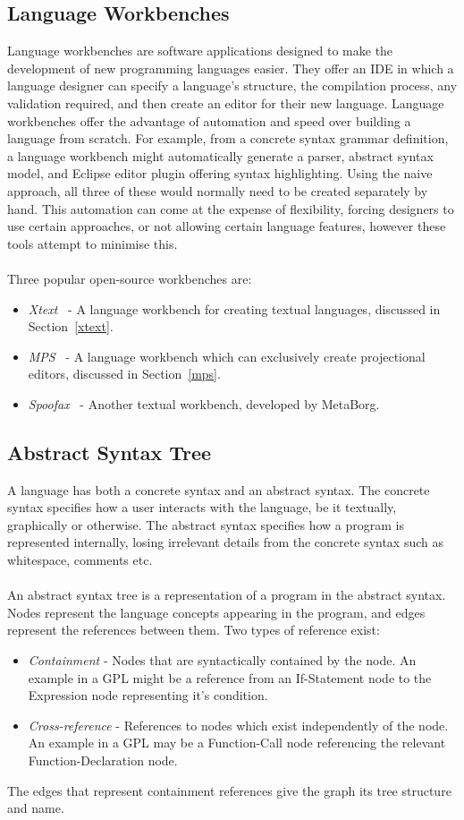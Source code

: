 \documentclass{article}
\begin{document}
\subsection{Language Workbenches}
Language workbenches are software applications designed to make the development of new programming languages easier. They offer an IDE in which a language designer can specify a language's structure, the compilation process, any validation required, and then create an editor for their new language. Language workbenches offer the advantage of automation and speed over building a language from scratch. For example, from a concrete syntax grammar definition, a language workbench might automatically generate a parser, abstract syntax model, and Eclipse editor plugin offering syntax highlighting. Using the naive approach, all three of these would normally need to be created separately by hand. This automation can come at the expense of flexibility, forcing designers to use certain approaches, or not allowing certain language features, however these tools attempt to minimise this. 
\\
\\
Three popular open-source workbenches are:
\begin{itemize}
\item \emph{Xtext}~\cite{xtext} - A language workbench for creating textual languages, discussed in Section~\ref{xtext}.
\item \emph{MPS}~\cite{mps} - A language workbench which can exclusively create projectional editors, discussed in Section~\ref{mps}.
\item \emph{Spoofax}~\cite{spoofax} - Another textual workbench, developed by MetaBorg. 
\end{itemize}
%
\subsection{Abstract Syntax Tree}
A language has both a concrete syntax and an abstract syntax. The concrete syntax specifies how a user interacts with the language, be it textually, graphically or otherwise. The abstract syntax specifies how a program is represented internally, losing irrelevant details from the concrete syntax such as whitespace, comments etc.
\\
\\
An abstract syntax tree is a representation of a program in the abstract syntax. Nodes represent the language concepts appearing in the program, and edges represent the references between them. Two types of reference exist:
\begin{itemize}
\item \emph{Containment} - Nodes that are syntactically contained by the node. An example in a GPL might be a reference from an If-Statement node to the Expression node representing it's condition.
\item \emph{Cross-reference} - References to nodes which exist independently of the node. An example in a GPL may be a Function-Call node referencing the relevant Function-Declaration node. 
\end{itemize}
The edges that represent containment references give the graph its tree structure and name.
\end{document}
